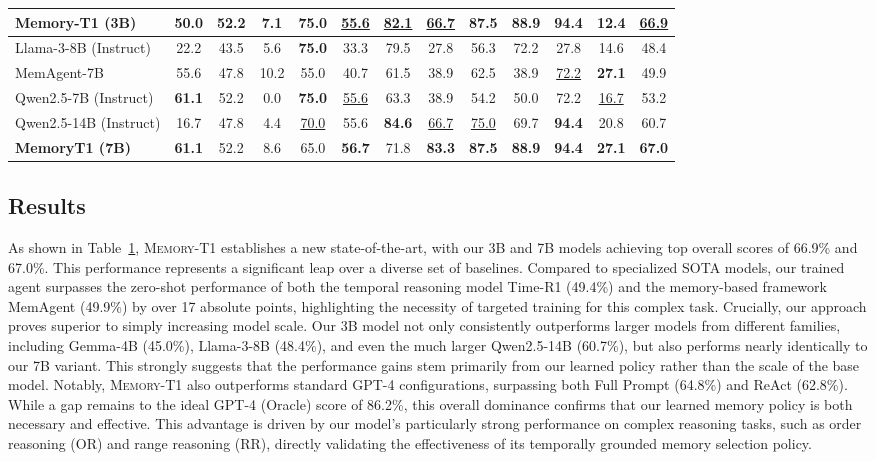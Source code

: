 \documentclass{article} %
\begin{document}
\begin{table}[t]
{\begin{tabular}{lcccccccccccc}
\rowcolor{gray!10}
\textbf{Memory-T1 (3B)}                             &50.0 & 52.2 & 7.1 & \textbf{75.0} & \underline{55.6} & \underline{82.1} & \underline{66.7} & \textbf{87.5} & \textbf{88.9} & \textbf{94.4} & 12.4 & \underline{66.9} \\
\midrule
Llama-3-8B (Instruct)                       & 22.2 & 43.5 & 5.6 & \textbf{75.0} & 33.3 & 79.5 & 27.8 & 56.3 & 72.2 & 27.8 & 14.6 & 48.4 \\
MemAgent-7B                                 &55.6 & 47.8 & 10.2 & 55.0 & 40.7 & 61.5 & 38.9 & 62.5 & 38.9 & \underline{72.2} & \textbf{27.1} & 49.9 \\
Qwen2.5-7B (Instruct)                       & \textbf{61.1} & 52.2 & 0.0 & \textbf{75.0} & \underline{55.6} & 63.3 & 38.9 & 54.2 & 50.0 & 72.2 & \underline{16.7} & 53.2 \\
Qwen2.5-14B (Instruct)                      & 16.7 & 47.8 & 4.4 & \underline{70.0} & 55.6 & \textbf{84.6} & \underline{66.7} & \underline{75.0} & 69.7 & \textbf{94.4} & 20.8 & 60.7 \\
\rowcolor{gray!10}
\textbf{MemoryT1 (7B)} & \textbf{61.1} &  52.2 & 8.6 & 65.0 & \textbf{56.7} & 71.8 & \textbf{83.3} & \textbf{87.5} & \textbf{88.9} & \textbf{94.4} & \textbf{27.1} & \textbf{67.0} \\
\bottomrule
\end{tabular}%
}
\endgroup

\label{tab:results}
\end{table}


\subsection{Results}
As shown in Table~\ref{tab:results}, \textsc{Memory-T1} establishes a new state-of-the-art, with our 3B and 7B models achieving top overall scores of 66.9\% and 67.0\%. This performance represents a significant leap over a diverse set of baselines. Compared to specialized SOTA models, our trained agent surpasses the zero-shot performance of both the temporal reasoning model Time-R1 (49.4\%) and the memory-based framework MemAgent (49.9\%) by over 17 absolute points, highlighting the necessity of targeted training for this complex task. Crucially, our approach proves superior to simply increasing model scale. Our 3B model not only consistently outperforms larger models from different families, including Gemma-4B (45.0\%), Llama-3-8B (48.4\%), and even the much larger Qwen2.5-14B (60.7\%), but also performs nearly identically to our 7B variant. This strongly suggests that the performance gains stem primarily from our learned policy rather than the scale of the base model. Notably, \textsc{Memory-T1} also outperforms standard GPT-4 configurations, surpassing both Full Prompt (64.8\%) and ReAct (62.8\%). While a gap remains to the ideal GPT-4 (Oracle) score of 86.2\%, this overall dominance confirms that our learned memory policy is both necessary and effective. This advantage is driven by our model's particularly strong performance on complex reasoning tasks, such as order reasoning (OR) and range reasoning (RR), directly validating the effectiveness of its temporally grounded memory selection policy. 
\end{document}

